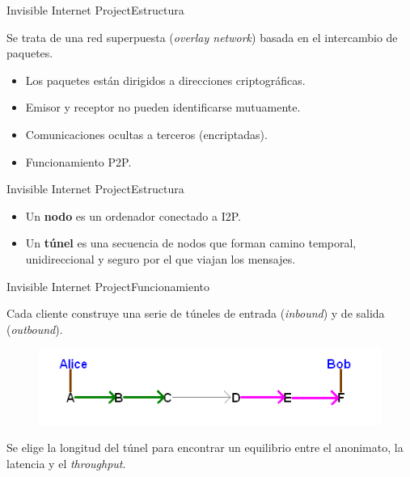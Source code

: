 \documentclass[spanish]{beamer}
\begin{document}
\begin{frame}{Invisible Internet Project}{Estructura}

Se trata de una red superpuesta (\textit{overlay network}) basada en el intercambio de paquetes.

\begin{itemize}
	\item Los paquetes están dirigidos a direcciones criptográficas.
	\item Emisor y receptor no pueden identificarse mutuamente.
	\item Comunicaciones ocultas a terceros (encriptadas).
	\item Funcionamiento P2P.
\end{itemize}
	
\end{frame}



\begin{frame}{Invisible Internet Project}{Estructura}

\begin{itemize}
\item Un \textbf{nodo} es un ordenador conectado a I2P.
\item Un \textbf{túnel} es una secuencia de nodos que forman camino temporal, unidireccional y seguro por el que viajan los mensajes.
\end{itemize}

	
\end{frame}



\begin{frame}{Invisible Internet Project}{Funcionamiento}

Cada cliente construye una serie de túneles de entrada (\textit{inbound}) y de salida (\textit{outbound}).


\begin{figure}
	\centering
	\includegraphics[width=.8\textwidth]{img/alice_bob_tunnel}
\end{figure}

Se elige la longitud del túnel para encontrar un equilibrio entre el anonimato, la latencia y el \textit{throughput}.

\end{frame}
\end{document}

